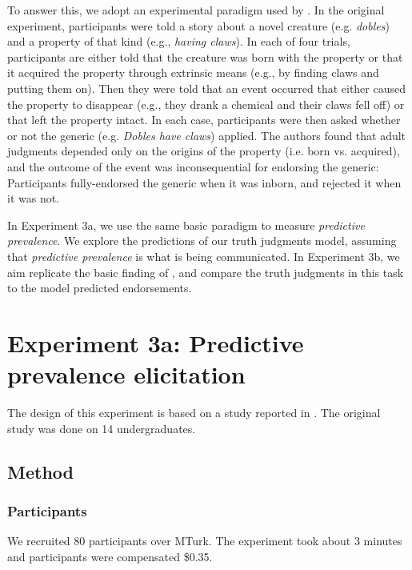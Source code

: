 \documentclass[12pt,letterpaper]{article}
\begin{document}
To answer this, we adopt an experimental paradigm used by .
In the original experiment, participants were told a story about a novel creature (e.g. \emph{dobles}) and a property of that kind (e.g., \emph{having claws}).
In each of four trials, participants are either told that the creature was born with the property or that it acquired the property through extrinsic means (e.g., by finding claws and putting them on). 
Then they were told that an event occurred that either caused the property to disappear (e.g., they drank a chemical and their claws fell off) or that left the property intact. 
In each case, participants were then asked whether or not the generic (e.g. \emph{Dobles have claws}) applied.
The authors found that adult judgments depended only on the origins of the property (i.e. born vs. acquired), and the outcome of the event was inconsequential for endorsing the generic: Participants fully-endorsed the generic when it was inborn, and rejected it when it was not.

In Experiment 3a, we use the same basic paradigm to measure \emph{predictive prevalence}.
We explore the predictions of our truth judgments model, assuming that \emph{predictive prevalence} is what is being communicated.
In Experiment 3b, we aim replicate the basic finding of , and compare the truth judgments in this task to the model predicted endorsements.

\section*{Experiment 3a: Predictive prevalence elicitation}

The design of this experiment is based on a study reported in .
The original study was done on 14 undergraduates.

\subsection*{Method}

\subsubsection*{Participants}
We recruited 80 participants over MTurk.  
The experiment took about 3 minutes and participants were compensated \$0.35.
\end{document}
